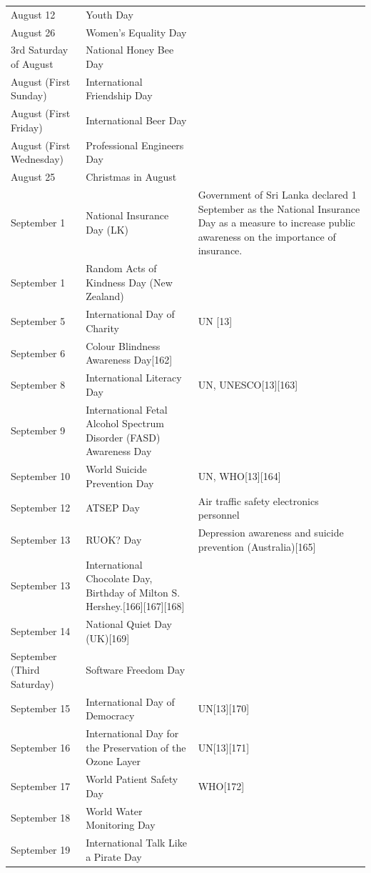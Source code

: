 \documentclass[
  openany]{book}
\begin{document}
\begin{longtable}[t]{>{\raggedright\arraybackslash}p{8em}>{\raggedright\arraybackslash}p{20em}>{\raggedright\arraybackslash}p{12em}}
\addlinespace
August 12 & Youth Day & \\
August 26 & Women's Equality Day & \\
3rd Saturday of August & National Honey Bee Day & \\
August (First Sunday) & International Friendship Day & \\
August (First Friday) & International Beer Day & \\
\addlinespace
August (First Wednesday) & Professional Engineers Day & \\
August 25 & Christmas in August & \\
September 1 & National Insurance Day (LK) & Government of Sri Lanka declared 1 September as the National Insurance Day as a measure to increase public awareness on the importance of insurance.\\
September 1 & Random Acts of Kindness Day (New Zealand) & \\
September 5 & International Day of Charity & UN [13]\\
\addlinespace
September 6 & Colour Blindness Awareness Day[162] & \\
September 8 & International Literacy Day & UN, UNESCO[13][163]\\
September 9 & International Fetal Alcohol Spectrum Disorder (FASD) Awareness Day & \\
September 10 & World Suicide Prevention Day & UN, WHO[13][164]\\
September 12 & ATSEP Day & Air traffic safety electronics personnel\\
\addlinespace
September 13 & RUOK? Day & Depression awareness and suicide prevention (Australia)[165]\\
September 13 & International Chocolate Day, Birthday of Milton S. Hershey.[166][167][168] & \\
September 14 & National Quiet Day (UK)[169] & \\
September (Third Saturday) & Software Freedom Day & \\
September 15 & International Day of Democracy & UN[13][170]\\
\addlinespace
September 16 & International Day for the Preservation of the Ozone Layer & UN[13][171]\\
September 17 & World Patient Safety Day & WHO[172]\\
September 18 & World Water Monitoring Day & \\
September 19 & International Talk Like a Pirate Day & \\

\end{longtable}
\end{document}
